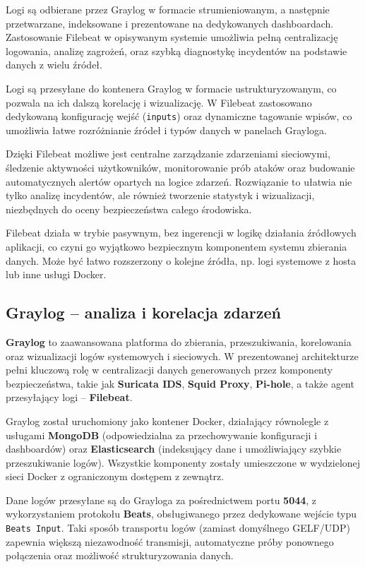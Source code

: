 \documentclass[
    left=2.5cm,         %
    right=2.5cm,        %
    top=2.5cm,          %
    bottom=3cm,         %
    bindingoffset=6mm,  %
    nohyphenation=true %
]{eiti/eiti-thesis} %
\begin{document}
Logi są odbierane przez Graylog w formacie strumieniowanym, a następnie przetwarzane, indeksowane i prezentowane na dedykowanych dashboardach. Zastosowanie Filebeat w opisywanym systemie umożliwia pełną centralizację logowania, analizę zagrożeń, oraz szybką diagnostykę incydentów na podstawie danych z wielu źródeł.



Logi są przesyłane do kontenera Graylog w formacie ustrukturyzowanym, co pozwala na ich dalszą korelację i wizualizację. W Filebeat zastosowano dedykowaną konfigurację wejść (\texttt{inputs}) oraz dynamiczne tagowanie wpisów, co umożliwia łatwe rozróżnianie źródeł i typów danych w panelach Grayloga.

Dzięki Filebeat możliwe jest centralne zarządzanie zdarzeniami sieciowymi, śledzenie aktywności użytkowników, monitorowanie prób ataków oraz budowanie automatycznych alertów opartych na logice zdarzeń. Rozwiązanie to ułatwia nie tylko analizę incydentów, ale również tworzenie statystyk i wizualizacji, niezbędnych do oceny bezpieczeństwa całego środowiska.

Filebeat działa w trybie pasywnym, bez ingerencji w logikę działania źródłowych aplikacji, co czyni go wyjątkowo bezpiecznym komponentem systemu zbierania danych. Może być łatwo rozszerzony o kolejne źródła, np. logi systemowe z hosta lub inne usługi Docker.

\subsection{Graylog – analiza i korelacja zdarzeń}

\textbf{Graylog}\cite{graylog-docs} to zaawansowana platforma do zbierania, przeszukiwania, korelowania oraz wizualizacji logów systemowych i sieciowych. W prezentowanej architekturze pełni kluczową rolę w centralizacji danych generowanych przez komponenty bezpieczeństwa, takie jak \textbf{Suricata IDS}, \textbf{Squid Proxy}, \textbf{Pi-hole}, a także agent przesyłający logi – \textbf{Filebeat}.

Graylog został uruchomiony jako kontener Docker, działający równolegle z usługami \textbf{MongoDB} (odpowiedzialna za przechowywanie konfiguracji i dashboardów) oraz \textbf{Elasticsearch} (indeksujący dane i umożliwiający szybkie przeszukiwanie logów). Wszystkie komponenty zostały umieszczone w wydzielonej sieci Docker z ograniczonym dostępem z zewnątrz.

Dane logów przesyłane są do Grayloga za pośrednictwem portu \textbf{5044}, z wykorzystaniem protokołu \textbf{Beats}, obsługiwanego przez dedykowane wejście typu \texttt{Beats Input}. Taki sposób transportu logów (zamiast domyślnego GELF/UDP) zapewnia większą niezawodność transmisji, automatyczne próby ponownego połączenia oraz możliwość strukturyzowania danych.
\end{document}
